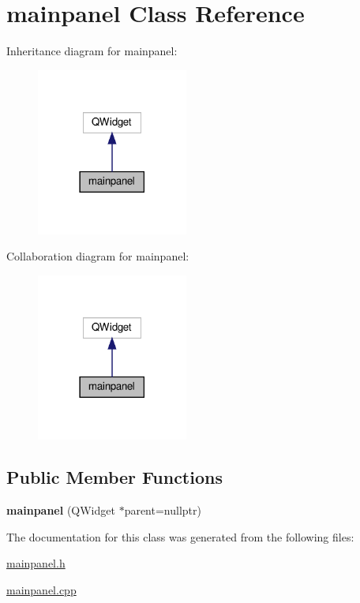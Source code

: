 \hypertarget{classmainpanel}{}\section{mainpanel Class Reference}
\label{classmainpanel}


Inheritance diagram for mainpanel\+:\nopagebreak
\begin{figure}[H]
\begin{center}
\leavevmode
\includegraphics[width=141pt]{classmainpanel__inherit__graph}
\end{center}
\end{figure}


Collaboration diagram for mainpanel\+:\nopagebreak
\begin{figure}[H]
\begin{center}
\leavevmode
\includegraphics[width=141pt]{classmainpanel__coll__graph}
\end{center}
\end{figure}
\subsection*{Public Member Functions}
\begin{DoxyCompactItemize}
\item 
\mbox{\label{classmainpanel_a20d907a14bc430ffdc6cedfbccf8705a}} 
{\bfseries mainpanel} (Q\+Widget $\ast$parent=nullptr)
\end{DoxyCompactItemize}


The documentation for this class was generated from the following files\+:\begin{DoxyCompactItemize}
\item 
\hyperlink{mainpanel_8h}{mainpanel.\+h}\item 
\hyperlink{mainpanel_8cpp}{mainpanel.\+cpp}\end{DoxyCompactItemize}
